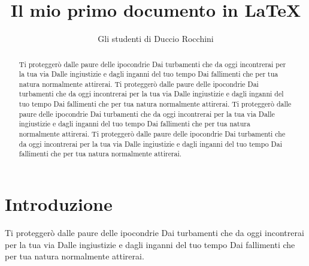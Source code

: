 \documentclass[12pt]{article}
\title{Il mio primo documento in LaTeX}
\author{Gli studenti di Duccio Rocchini}
\begin{document}
\maketitle

\tableofcontents
\listoffigures

\begin{abstract}
    Ti proteggerò dalle paure delle ipocondrie
Dai turbamenti che da oggi incontrerai per la tua via
Dalle ingiustizie e dagli inganni del tuo tempo
Dai fallimenti che per tua natura normalmente attirerai.
Ti proteggerò dalle paure delle ipocondrie
Dai turbamenti che da oggi incontrerai per la tua via
Dalle ingiustizie e dagli inganni del tuo tempo
Dai fallimenti che per tua natura normalmente attirerai.
Ti proteggerò dalle paure delle ipocondrie
Dai turbamenti che da oggi incontrerai per la tua via
Dalle ingiustizie e dagli inganni del tuo tempo
Dai fallimenti che per tua natura normalmente attirerai.
Ti proteggerò dalle paure delle ipocondrie
Dai turbamenti che da oggi incontrerai per la tua via
Dalle ingiustizie e dagli inganni del tuo tempo
Dai fallimenti che per tua natura normalmente attirerai.
\end{abstract}

\section{Introduzione} \label{sec:intro}
Ti proteggerò dalle paure delle ipocondrie
Dai turbamenti che da oggi incontrerai per la tua via
Dalle ingiustizie e dagli inganni del tuo tempo
Dai fallimenti che per tua natura normalmente attirerai.

\end{document}
